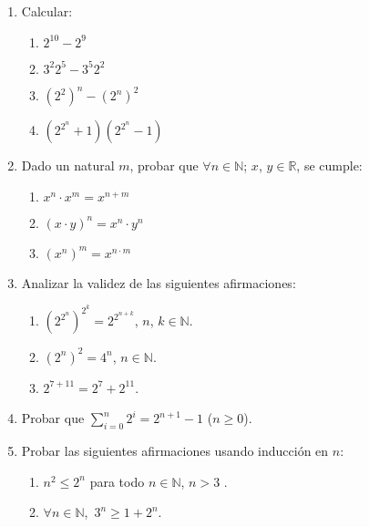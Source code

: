 \documentclass[12pt,spanish,makeidx]{amsbook}
\begin{document}
\begin{enumerate}
\smallskip

\item Calcular:
\begin{multicols}{2}
 \begin{enumerate}
\item \quad $2^{10} - 2^{9}$
\item \quad $3^2 2^5 - 3^5 2^2$
\item \quad $(2^2)^n - (2^n)^2$
\item \quad $(2^{2^n} + 1)  (2^{2^n} - 1)$
\end{enumerate}
\end{multicols}




\smallskip




\item Dado un natural $m$, probar que $\forall n \in {\mathbb N} $; $x$, $y \in {\mathbb R}$, se cumple:
\begin{multicols}{3}
 \begin{enumerate}
  \item $x^n \cdot x^m = x^{n+m}$
\item $(x\cdot y)^n=x^n\cdot y^n$
\item $(x^n)^m = x^{n\cdot m}$
 \end{enumerate}
\end{multicols}



\smallskip

\item Analizar la validez de las siguientes afirmaciones:
 \begin{enumerate}
\item  $(2^{2^n})^{2^k} = 2^{2^{n+k}}$,  $n$, $k \in {\mathbb N}$.
\item $(2^n)^2 = 4^n$, $n \in {\mathbb N}$.
\item $2^{7+11} = 2^7 + 2^{11}$.
\end{enumerate}

\smallskip

\item Probar que $\sum_{i=0}^n 2^i = 2^{n+1} -1$ ($n \ge 0$). 


\smallskip

\item Probar las siguientes afirmaciones usando inducción en $n$:
\begin{enumerate}
	\item $n^2\leq 2^n$ para todo $n\in{\mathbb N}$, $n>3$ .
	\item $\forall n \in {\mathbb N}$,\ $3^n \ge 1 + 2^n$.
\end{enumerate}


\end{enumerate}
\end{document}

